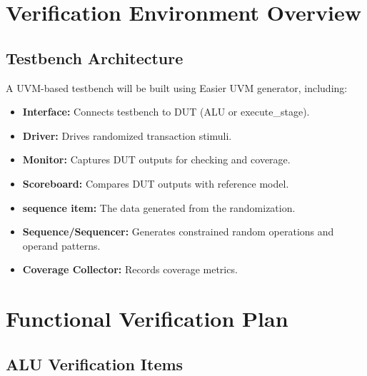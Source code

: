 \documentclass[a4paper,12pt]{article}
\begin{document}
\section{Verification Environment Overview}

\subsection{Testbench Architecture}
A UVM-based testbench will be built using Easier UVM generator, including:
\begin{itemize}
    \item \textbf{Interface:} Connects testbench to DUT (ALU or execute\_stage).
    \item \textbf{Driver:} Drives randomized transaction stimuli.
    \item \textbf{Monitor:} Captures DUT outputs for checking and coverage.
    \item \textbf{Scoreboard:} Compares DUT outputs with reference model.
    \item \textbf{sequence item:} The data generated from the randomization.
    \item \textbf{Sequence/Sequencer:} Generates constrained random operations and operand patterns.
    \item \textbf{Coverage Collector:} Records coverage metrics.
\end{itemize}


\section{Functional Verification Plan}

\subsection{ALU Verification Items}
\end{document}
